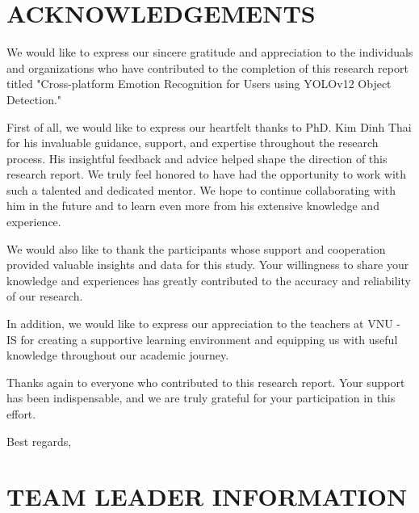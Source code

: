 \documentclass[a4paper,13pt]{report}
\begin{document}
\clearpage
\chapter*{ACKNOWLEDGEMENTS}
\setcounter{chapter}{0}
\renewcommand{\thesection}{\arabic{section}}
We would like to express our sincere gratitude and appreciation to the individuals and organizations who have contributed to the completion of this research report titled "Cross-platform Emotion Recognition for Users using YOLOv12 Object Detection."

First of all, we would like to express our heartfelt thanks to PhD. Kim Dinh Thai for his invaluable guidance, support, and expertise throughout the research process. His insightful feedback and advice helped shape the direction of this research report.
We truly feel honored to have had the opportunity to work with such a talented and dedicated mentor. We hope to continue collaborating with him in the future and to learn even more from his extensive knowledge and experience.

We would also like to thank the participants whose support and cooperation provided valuable insights and data for this study. Your willingness to share your knowledge and experiences has greatly contributed to the accuracy and reliability of our research.

In addition, we would like to express our appreciation to the teachers at VNU - IS for creating a supportive learning environment and equipping us with useful knowledge throughout our academic journey.

Thanks again to everyone who contributed to this research report. Your support has been indispensable, and we are truly grateful for your participation in this effort.

Best regards,



\clearpage
\chapter*{TEAM LEADER INFORMATION}
\setcounter{chapter}{0}
\renewcommand{\thesection}{\arabic{section}}
\end{document}
